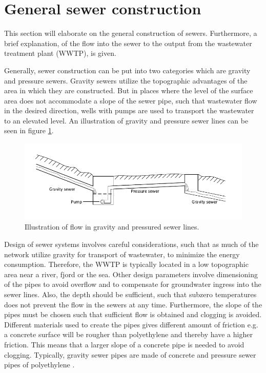 \section{General sewer construction}\label{se:sewer_construction}
This section will elaborate on the general construction of sewers. Furthermore, a brief explanation, of the flow into the sewer to the output from the wastewater treatment plant (WWTP), is given.


Generally, sewer construction can be put into two categories which are gravity and pressure sewers. Gravity sewers utilize the topographic advantages of the area in which they are constructed. But in places where the level of the surface area does not accommodate a slope of the sewer pipe, such that wastewater flow in the desired direction, wells with pumps are used to transport the wastewater to an elevated level. An illustration of gravity and pressure sewer lines can be seen in figure \ref{fig:Sewer_drawing}. 

\begin{figure}[H]
\centering
\includegraphics[width=1\textwidth]{report/introduction/pictures/Sewer_drawing.pdf}
\caption{Illustration of flow in gravity and pressured sewer lines.}
\label{fig:Sewer_drawing}
\end{figure}

Design of sewer systems involves careful considerations, such that as much of the network utilize gravity for transport of wastewater, to minimize the energy consumption. Therefore, the WWTP is typically located in a low topographic area near a river, fjord or the sea. Other design parameters involve dimensioning of the pipes to avoid overflow and to compensate for groundwater ingress into the sewer lines.
Also, the depth should be sufficient, such that subzero temperatures does not prevent the flow in the sewers at any time. Furthermore, the slope of the pipes must be chosen such that sufficient flow is obtained and clogging is avoided. Different materials used to create the pipes gives different amount of friction e.g. a concrete surface will be rougher than polyethylene and thereby have a higher friction. This means that a larger slope of a concrete pipe is needed to avoid clogging. Typically, gravity sewer pipes are made of concrete and pressure sewer pipes of polyethylene \cite{Sewer_processes}.


